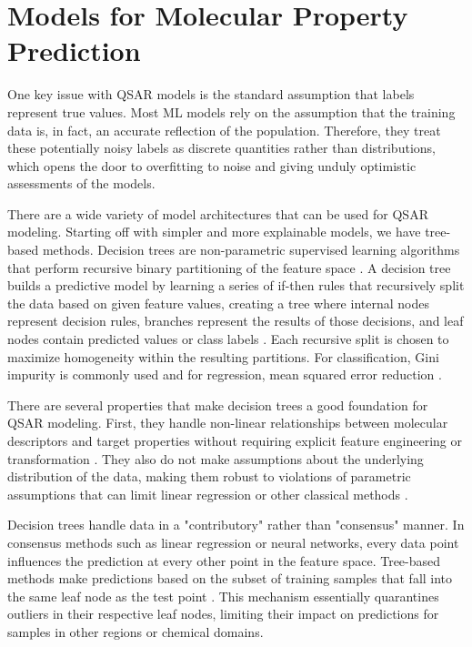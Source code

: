 \section{Models for Molecular Property Prediction}

One key issue with QSAR models is the standard assumption that labels represent true values. Most ML models rely on the assumption that the training data is, in fact, an accurate reflection of the population. Therefore, they treat these potentially noisy labels as discrete quantities rather than distributions, which opens the door to overfitting to noise and giving unduly optimistic assessments of the models.

There are a wide variety of model architectures that can be used for QSAR modeling. Starting off with simpler and more explainable models, we have tree-based methods. Decision trees are non-parametric supervised learning algorithms that perform recursive binary partitioning of the feature space \citep{Breiman1984}. A decision tree builds a predictive model by learning a series of if-then rules that recursively split the data based on given feature values, creating a tree  where internal nodes represent decision rules, branches represent the results of those decisions, and leaf nodes contain predicted values or class labels \citep{Breiman1984}. Each recursive split is chosen to maximize  homogeneity within the resulting partitions. For classification, Gini impurity is commonly used and for regression, mean squared error reduction \citep{Breiman1984}.

There are several properties that make decision trees a good foundation for QSAR modeling. First, they handle non-linear relationships between molecular descriptors and target properties without requiring explicit feature engineering or transformation \citep{Breiman1984}. They also do not make assumptions about the underlying distribution of the data, making them robust to violations of parametric assumptions that can limit linear regression or other classical methods \citep{Svetnik2003}. 

Decision trees handle data in a "contributory" rather than "consensus" manner. In consensus methods such as linear regression or neural networks, every data point influences the prediction at every other point in the feature space. Tree-based methods make predictions based on the subset of training samples that fall into the same leaf node as the test point \citep{Breiman1984}. This mechanism essentially quarantines outliers in their respective leaf nodes, limiting their impact on predictions for samples in other regions or chemical domains. 

